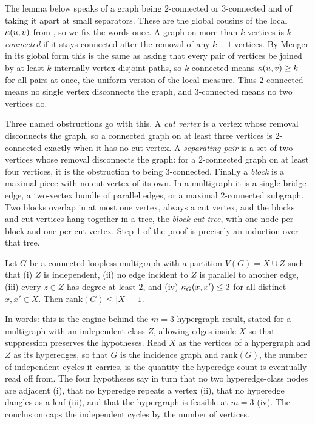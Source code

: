 \begin{primer}
The lemma below speaks of a graph being $2$-connected or $3$-connected and of
taking it apart at small separators. These are the global cousins of the local
$\kappa(u, v)$ from , so we fix the words once. A graph on more
than $k$ vertices is \emph{$k$-connected} if it stays connected after the removal
of any $k - 1$ vertices. By Menger in its global form \cite[Ch.~3]{Diestel17} this is the same as asking that every pair of
vertices be joined by at least $k$ internally vertex-disjoint paths, so
$k$-connected means $\kappa(u, v) \ge k$ for all pairs at once, the uniform version
of the local measure. Thus $2$-connected means no single vertex disconnects the
graph, and $3$-connected means no two vertices do.

Three named obstructions go with this. A \emph{cut vertex} is a vertex whose
removal disconnects the graph, so a connected graph on at least three vertices is
$2$-connected exactly when it has no cut vertex. A \emph{separating pair} is a set
of two vertices whose removal disconnects the graph: for a $2$-connected graph
on at least four vertices, it is the obstruction to being $3$-connected. Finally a \emph{block}
is a maximal piece with no cut vertex of its own. In a multigraph it is a single
bridge edge, a two-vertex bundle of parallel edges, or a maximal
$2$-connected subgraph. Two blocks overlap in at most one vertex,
always a cut vertex, and the blocks and cut vertices hang together in a tree, the
\emph{block-cut tree}, with one node per block and one per cut vertex. Step 1 of
the proof is precisely an induction over that tree.
\end{primer}

\begin{lemma}\label{lem:incidence-rank}
Let $G$ be a connected loopless multigraph with a partition $V(G)=X \mathbin{\dot\cup} Z$ such that
(i) $Z$ is independent, (ii) no edge incident to $Z$ is parallel to another
edge, (iii) every $z \in Z$ has degree at least $2$, and (iv)
$\kappa_G(x, x') \le 2$ for all distinct $x, x' \in X$. Then
$\mathrm{rank}(G) \le |X| - 1$.
\end{lemma}

In words: this is the engine behind the $m = 3$ hypergraph result, stated for a multigraph with an independent class $Z$, allowing edges inside $X$ so that suppression preserves the hypotheses. Read $X$ as the vertices of a hypergraph and $Z$ as its hyperedges, so that $G$ is the incidence graph and $\mathrm{rank}(G)$, the number of independent cycles it carries, is the quantity the hyperedge count is eventually read off from. The four hypotheses say in turn that no two hyperedge-class nodes are adjacent (i), that no hyperedge repeats a vertex (ii), that no hyperedge dangles as a leaf (iii), and that the hypergraph is feasible at $m = 3$ (iv). The conclusion caps the independent cycles by the number of vertices.

